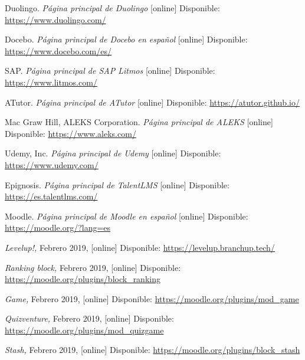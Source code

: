 \begin{thebibliography}{9}
    Duolingo. \textit{Página principal de Duolingo} [online] Disponible: \url{https://www.duolingo.com/}

    Docebo. \textit{Página principal de Docebo en español} [online] Disponible:
    \url{https://www.docebo.com/es/}
    
    SAP. \textit{Página principal de SAP Litmos} [online] Disponible:
    \url{https://www.litmos.com/}

    ATutor. \textit{Página principal de ATutor} [online] Disponible:
    \url{https://atutor.github.io/}

    Mac Graw Hill, ALEKS Corporation. \textit{Página principal de ALEKS} [online] Disponible:    
    \url{https://www.aleks.com/}

    Udemy, Inc. \textit{Página principal de Udemy} [online]  Disponible:
    \url{https://www.udemy.com/}
 
    Epignosis. \textit{Página principal de TalentLMS} [online]  Disponible:
    \url{https://es.talentlms.com/}

    Moodle. \textit{Página principal de Moodle en español} [online] Disponible:
    \url{https://moodle.org/?lang=es}



        \textit{Levelup!,}
        Febrero 2019, [online] Disponible:  
        \url{https://levelup.branchup.tech/}
    
        \textit{Ranking block,}
        Febrero 2019, [online] Disponible:  
        \url{https://moodle.org/plugins/block_ranking}
    
        \textit{Game,}
        Febrero 2019, [online] Disponible:  
        \url{https://moodle.org/plugins/mod_game}
        
        \textit{Quizventure,}
        Febrero 2019, [online] Disponible:  
        \url{https://moodle.org/plugins/mod_quizgame}
        
        \textit{Stash,}
        Febrero 2019, [online] Disponible:  
        \url{https://moodle.org/plugins/block_stash}
    

\end{thebibliography}
